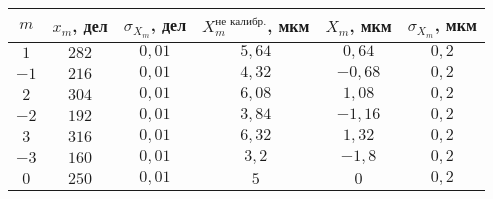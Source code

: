 \begin{tabular}{| c | c | c | c | c | c |}
\hline
$m$ & $x_m$, дел & $\sigma_{X_m}$, дел& $X_m^{\text{не калибр.}}$, мкм & $X_m$, мкм & $\sigma_{X_m}$, мкм\\
\hline
$1$ & $282$ & $0,01$ & $5,64$ & $0,64$ & $0,2$\\
\hline
$-1$ & $216$ & $0,01$ & $4,32$ & $-0,68$ & $0,2$\\
\hline
$2$ & $304$ & $0,01$ & $6,08$ & $1,08$ & $0,2$\\
\hline
$-2$ & $192$ & $0,01$ & $3,84$ & $-1,16$ & $0,2$\\
\hline
$3$ & $316$ & $0,01$ & $6,32$ & $1,32$ & $0,2$\\
\hline
$-3$ & $160$ & $0,01$ & $3,2$ & $-1,8$ & $0,2$\\
\hline
$0$ & $250$ & $0,01$ & $5$ & $0$ & $0,2$\\
\hline
\end{tabular}
